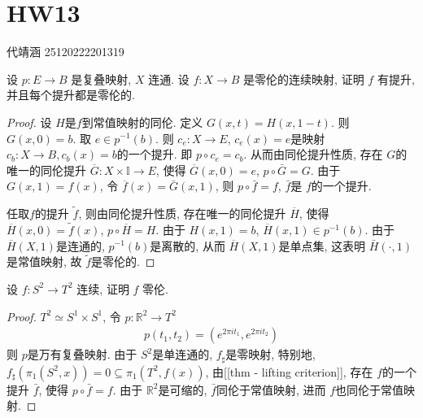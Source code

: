 \documentclass[../main.tex]{subfiles}
\begin{document}
\ifSubfilesClassLoaded{

    
    \setcounter{chapter}{12}
}{}

\chapter{ HW13 }
 代靖涵 25120222201319
\begin{exercise}{}{}
设 $p: E \to B$ 是复叠映射, $X$ 连通. 设 $f: X \to B$ 是零伦的连续映射, 证明 $f$ 有提升, 并且每个提升都是零伦的.
\end{exercise}
\begin{proof}
设 $H$是$f$到常值映射的同伦. 定义 $G\left(x,t\right)= H\left(x,1-t\right)$. 则 $G\left(x,0\right)= b$. 取 $e\in p^{-1} \left(b\right)$. 则 $c_{e}: X\to E$, $c_{e}\left(x\right)= e$是映射 $c_{b}:X\to B, c_{b}\left(x\right)= b$的一个提升. 即 $p\circ c_{e}= c_{b}$. 从而由同伦提升性质, 存在 $G$的唯一的同伦提升 $\overline{G}: X\times \mathbb{I}\to E$, 使得 $\overline{G}\left(x,0\right)=e$, $p\circ \bar{G}= G$. 由于 $G\left(x,1\right)= f\left(x\right)$, 令 $\overline{f}\left(x\right)= \bar{G}\left(x,1\right)$, 则 $p\circ \bar{f}= f$, $\bar{f}$是 $f$的一个提升.

任取$f$的提升 $\tilde{f}$, 则由同伦提升性质, 存在唯一的同伦提升 $\overline{H}$, 使得 $\overline{H}\left(x,0\right)= \tilde{f}\left(x\right)$, $p\circ  \overline{H}=H$. 由于 $H\left(x,1\right)=b$, $\overline{H}\left(x,1\right)\in p^{-1} \left(b\right)$. 由于 $\overline{H}\left(X,1\right)$是连通的, $p^{-1} \left(b\right)$是离散的, 从而 $\overline{H}\left(X,1\right)$是单点集, 这表明 $\bar{H}\left(\cdot ,1\right)$是常值映射, 故 $\tilde{f}$是零伦的.
\end{proof}
\begin{exercise}{}{}
设 $f: S^2 \to T^2$ 连续, 证明 $f$ 零伦.
\end{exercise}
\begin{proof}
$T^{2}\simeq S^{1}\times S^{1}$, 令 $p: \mathbb{R} ^{2}\to T^{2}$
 $$ \begin{aligned} p\left(t_1,t_2\right) =\left(e^{2\pi i t_1}, e^{2\pi i t_2}\right) \end{aligned} $$
则 $p$是万有复叠映射. 由于 $S^{2}$是单连通的, $f_{\sharp}$是零映射, 特别地,  $f_{\sharp}\left(\pi_1\left(S^{2},x\right)\right) =0\subseteq \pi_1\left(T^{2}, f\left(x\right)\right)$, 由[[thm - lifting criterion]], 存在 $f$的一个提升 $\bar{f}$, 使得 $p\circ \bar{f} =f$. 由于 $\mathbb{R} ^{2}$是可缩的, $\bar{f}$同伦于常值映射, 进而 $f$也同伦于常值映射.
\end{proof}
\end{document}
